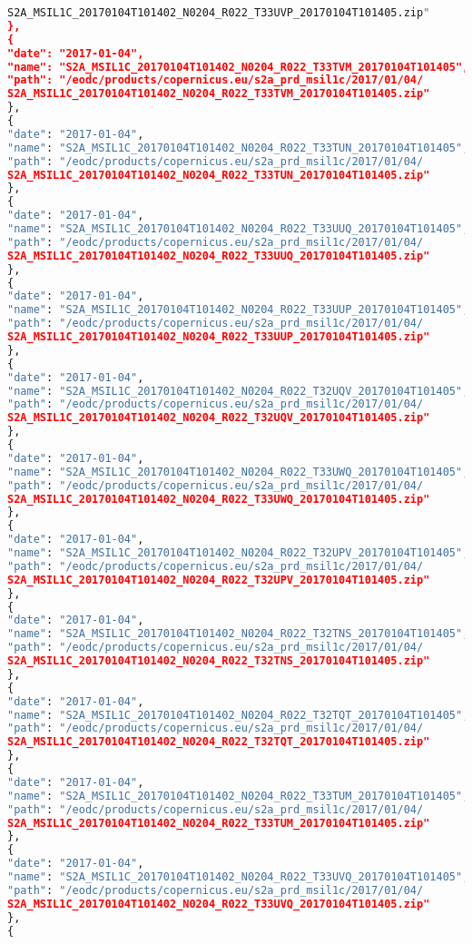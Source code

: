 \documentclass[draft,final]{vutinfth} %
\begin{document}
\begin{lstlisting}[frame=single, language=Python]
S2A_MSIL1C_20170104T101402_N0204_R022_T33UVP_20170104T101405.zip"
},
{
"date": "2017-01-04",
"name": "S2A_MSIL1C_20170104T101402_N0204_R022_T33TVM_20170104T101405",
"path": "/eodc/products/copernicus.eu/s2a_prd_msil1c/2017/01/04/
S2A_MSIL1C_20170104T101402_N0204_R022_T33TVM_20170104T101405.zip"
},
{
"date": "2017-01-04",
"name": "S2A_MSIL1C_20170104T101402_N0204_R022_T33TUN_20170104T101405",
"path": "/eodc/products/copernicus.eu/s2a_prd_msil1c/2017/01/04/
S2A_MSIL1C_20170104T101402_N0204_R022_T33TUN_20170104T101405.zip"
},
{
"date": "2017-01-04",
"name": "S2A_MSIL1C_20170104T101402_N0204_R022_T33UUQ_20170104T101405",
"path": "/eodc/products/copernicus.eu/s2a_prd_msil1c/2017/01/04/
S2A_MSIL1C_20170104T101402_N0204_R022_T33UUQ_20170104T101405.zip"
},
{
"date": "2017-01-04",
"name": "S2A_MSIL1C_20170104T101402_N0204_R022_T33UUP_20170104T101405",
"path": "/eodc/products/copernicus.eu/s2a_prd_msil1c/2017/01/04/
S2A_MSIL1C_20170104T101402_N0204_R022_T33UUP_20170104T101405.zip"
},
{
"date": "2017-01-04",
"name": "S2A_MSIL1C_20170104T101402_N0204_R022_T32UQV_20170104T101405",
"path": "/eodc/products/copernicus.eu/s2a_prd_msil1c/2017/01/04/
S2A_MSIL1C_20170104T101402_N0204_R022_T32UQV_20170104T101405.zip"
},
{
"date": "2017-01-04",
"name": "S2A_MSIL1C_20170104T101402_N0204_R022_T33UWQ_20170104T101405",
"path": "/eodc/products/copernicus.eu/s2a_prd_msil1c/2017/01/04/
S2A_MSIL1C_20170104T101402_N0204_R022_T33UWQ_20170104T101405.zip"
},
{
"date": "2017-01-04",
"name": "S2A_MSIL1C_20170104T101402_N0204_R022_T32UPV_20170104T101405",
"path": "/eodc/products/copernicus.eu/s2a_prd_msil1c/2017/01/04/
S2A_MSIL1C_20170104T101402_N0204_R022_T32UPV_20170104T101405.zip"
},
{
"date": "2017-01-04",
"name": "S2A_MSIL1C_20170104T101402_N0204_R022_T32TNS_20170104T101405",
"path": "/eodc/products/copernicus.eu/s2a_prd_msil1c/2017/01/04/
S2A_MSIL1C_20170104T101402_N0204_R022_T32TNS_20170104T101405.zip"
},
{
"date": "2017-01-04",
"name": "S2A_MSIL1C_20170104T101402_N0204_R022_T32TQT_20170104T101405",
"path": "/eodc/products/copernicus.eu/s2a_prd_msil1c/2017/01/04/
S2A_MSIL1C_20170104T101402_N0204_R022_T32TQT_20170104T101405.zip"
},
{
"date": "2017-01-04",
"name": "S2A_MSIL1C_20170104T101402_N0204_R022_T33TUM_20170104T101405",
"path": "/eodc/products/copernicus.eu/s2a_prd_msil1c/2017/01/04/
S2A_MSIL1C_20170104T101402_N0204_R022_T33TUM_20170104T101405.zip"
},
{
"date": "2017-01-04",
"name": "S2A_MSIL1C_20170104T101402_N0204_R022_T33UVQ_20170104T101405",
"path": "/eodc/products/copernicus.eu/s2a_prd_msil1c/2017/01/04/
S2A_MSIL1C_20170104T101402_N0204_R022_T33UVQ_20170104T101405.zip"
},
{

\end{lstlisting}
\end{document}
